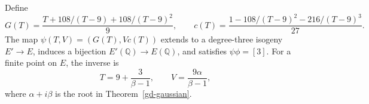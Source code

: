 \begin{theorem}
\label{gd-opposite}
Define
\begin{equation}\label{gd-psi}
 G(T)=\frac{T+108/(T-9)+108/(T-9)^2}{9},\qquad
 c(T)=\frac{1-108/(T-9)^2-216/(T-9)^3}{27}.
\end{equation}
The map \(\psi(T,V)=(G(T),Vc(T))\) extends to a degree-three
isogeny \(E'\to E\), induces a bijection
\(E'(\mathbb Q)\to E(\mathbb Q)\), and satisfies
\(\psi\phi=[3]\).
For a finite point on \(E\), the inverse is
\begin{equation}\label{gd-psi-inverse}
 T=9+\frac3{\beta-1},\qquad V=\frac{9\alpha}{\beta-1},
\end{equation}
where \(\alpha+i\beta\) is the root in
Theorem~\ref{gd-gaussian}.
\end{theorem}
